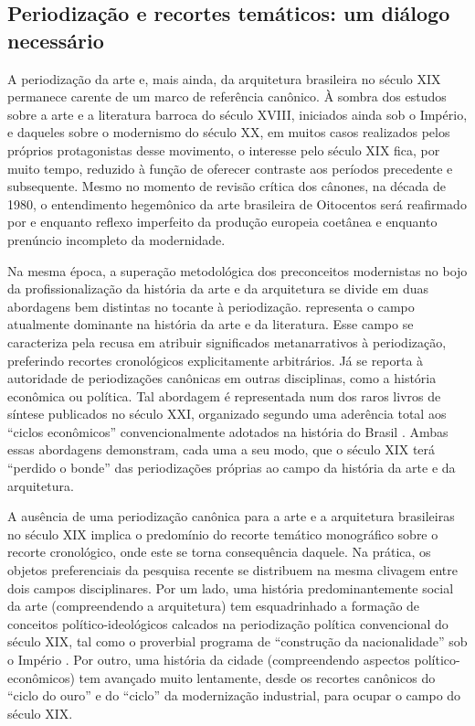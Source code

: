 \hypertarget{periodizauxe7uxe3o-e-recortes-temuxe1ticos-um-diuxe1logo-necessuxe1rio}{%
\subsection{Periodização e recortes temáticos: um diálogo
necessário}\label{periodizauxe7uxe3o-e-recortes-temuxe1ticos-um-diuxe1logo-necessuxe1rio}}

A periodização da arte e, mais ainda, da arquitetura brasileira no
século XIX permanece carente de um marco de referência canônico. À
sombra dos estudos sobre a arte e a literatura barroca do século XVIII,
iniciados ainda sob o Império, e daqueles sobre o modernismo do século
XX, em muitos casos realizados pelos próprios protagonistas desse
movimento, o interesse pelo século XIX fica, por muito tempo, reduzido à
função de oferecer contraste aos períodos precedente e subsequente.
Mesmo no momento de revisão crítica dos cânones, na década de 1980, o
entendimento hegemônico da arte brasileira de Oitocentos será reafirmado
por \textcite{campofiorito:1983historia} e \textcite{fabris:1987luz}
enquanto reflexo imperfeito da produção europeia coetânea e enquanto
prenúncio incompleto da modernidade.

Na mesma época, a superação metodológica dos preconceitos modernistas no
bojo da profissionalização da história da arte e da arquitetura se
divide em duas abordagens bem distintas no tocante à periodização.
\textcite{pereira:1995mudanca1} representa o campo atualmente dominante
na história da arte e da literatura. Esse campo se caracteriza pela
recusa em atribuir significados metanarrativos à periodização,
preferindo recortes cronológicos explicitamente arbitrários. Já
\textcite{lemos:1989alvenaria} se reporta à autoridade de periodizações
canônicas em outras disciplinas, como a história econômica ou política.
Tal abordagem é representada num dos raros livros de síntese publicados
no século XXI, organizado segundo uma aderência total aos ``ciclos
econômicos'' convencionalmente adotados na história do Brasil
\autocite{bicca:2007arquitetura}. Ambas essas abordagens demonstram,
cada uma a seu modo, que o século XIX terá ``perdido o bonde'' das
periodizações próprias ao campo da história da arte e da arquitetura.

A ausência de uma periodização canônica para a arte e a arquitetura
brasileiras no século XIX implica o predomínio do recorte temático
monográfico sobre o recorte cronológico, onde este se torna consequência
daquele. Na prática, os objetos preferenciais da pesquisa recente se
distribuem na mesma clivagem entre dois campos disciplinares. Por um
lado, uma história predominantemente social da arte (compreendendo a
arquitetura) tem esquadrinhado a formação de conceitos
político-ideológicos calcados na periodização política convencional do
século XIX, tal como o proverbial programa de ``construção da
nacionalidade'' sob o Império \autocite{camargo:2012leitores1}. Por
outro, uma história da cidade (compreendendo aspectos
político-econômicos) tem avançado muito lentamente, desde os recortes
canônicos do ``ciclo do ouro'' e do ``ciclo'' da modernização
industrial, para ocupar o campo do século XIX.

